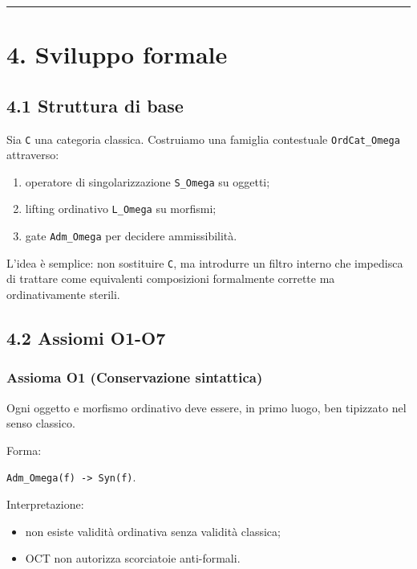 \begin{center}\rule{0.5\linewidth}{0.5pt}\end{center}

\section{4. Sviluppo formale}

\subsection{4.1 Struttura di base}

Sia \texttt{C} una categoria classica. Costruiamo una famiglia contestuale \texttt{OrdCat\_Omega} attraverso:

\begin{enumerate}
\def\labelenumi{\arabic{enumi}.}
\tightlist
\item
  operatore di singolarizzazione \texttt{S\_Omega} su oggetti;
\item
  lifting ordinativo \texttt{L\_Omega} su morfismi;
\item
  gate \texttt{Adm\_Omega} per decidere ammissibilità.
\end{enumerate}

L'idea è semplice: non sostituire \texttt{C}, ma introdurre un filtro interno che impedisca di trattare come equivalenti composizioni formalmente corrette ma ordinativamente sterili.

\subsection{4.2 Assiomi O1-O7}

\subsubsection{Assioma O1 (Conservazione sintattica)}

Ogni oggetto e morfismo ordinativo deve essere, in primo luogo, ben tipizzato nel senso classico.

Forma:

\texttt{Adm\_Omega(f)\ -\textgreater{}\ Syn(f)}.

Interpretazione:

\begin{itemize}
\tightlist
\item
  non esiste validità ordinativa senza validità classica;
\item
  OCT non autorizza scorciatoie anti-formali.
\end{itemize}

